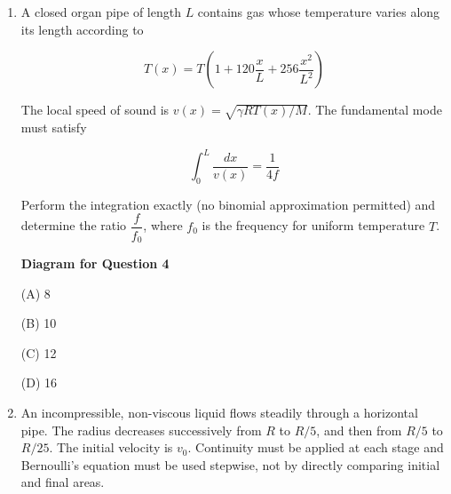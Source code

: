 \documentclass[12pt]{article}
\begin{document}
\begin{enumerate}

(A) $\dfrac{(\mu-1)t}{\mu\lambda}\beta$  

(B) $\dfrac{(\mu-1)t}{\lambda}\beta$  

(C) $\dfrac{t}{\mu\lambda}\beta$ 

(D) Zero  

\item A closed organ pipe of length $L$ contains gas whose temperature varies along its length according to  

\[
T(x)=T\left(1+120\frac{x}{L}+256\frac{x^2}{L^2}\right)
\]

The local speed of sound is $v(x)=\sqrt{\gamma RT(x)/M}$. The fundamental mode must satisfy  

\[
\int_0^L \frac{dx}{v(x)}=\frac{1}{4f}
\]

Perform the integration exactly (no binomial approximation permitted) and determine the ratio $\dfrac{f}{f_0}$, where $f_0$ is the frequency for uniform temperature $T$.


\begin{center}
\textbf{Diagram for Question 4}
\end{center}


(A) 8  

(B) 10  

(C) 12  

(D) 16  

\item An incompressible, non-viscous liquid flows steadily through a horizontal pipe. The radius decreases successively from $R$ to $R/5$, and then from $R/5$ to $R/25$. The initial velocity is $v_0$. Continuity must be applied at each stage and Bernoulli’s equation must be used stepwise, not by directly comparing initial and final areas.


\end{enumerate}
\end{document}
